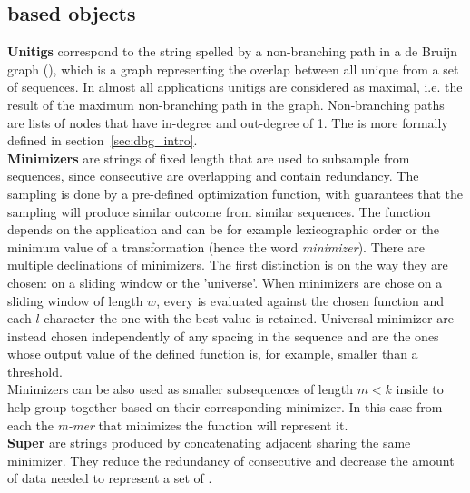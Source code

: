 \subsection{\kmer based objects}
\label{sec:kmerobjects}
\textbf{Unitigs} correspond to the string spelled by a non-branching path in a de Bruijn graph (\dbg), which is a graph representing the overlap between all unique \kmers from a set of sequences. In almost all applications unitigs are considered as maximal, i.e. the result of the maximum non-branching path in the graph. Non-branching paths are lists of nodes that have in-degree and out-degree of 1. The \dbg is more formally defined in section~\ref{sec:dbg_intro}.\\
\textbf{Minimizers} are strings of fixed length that are used to subsample \kmers from sequences, since consecutive \kmers are overlapping and contain redundancy. The sampling is done by a pre-defined optimization function, with guarantees that the sampling will produce similar outcome from similar sequences. The function depends on the application and can be for example lexicographic order or the minimum value of a transformation (hence the word \emph{minimizer}). There are multiple declinations of minimizers. The first distinction is on the way they are chosen: on a sliding window or the 'universe'. When minimizers are chose on a sliding window of length $w$, every \kmer is evaluated against the chosen function and each $l$ character the one with the best value is retained. Universal minimizer are instead chosen independently of any spacing in the sequence and are the ones whose output value of the defined function is, for example, smaller than a threshold. \\
Minimizers can be also used as smaller subsequences of length $m < k$ inside \kmers to help group together \kmers based on their corresponding minimizer. In this case from each \kmer the \emph{m-mer} that minimizes the function will represent it. \\
\textbf{Super\kmers} are strings produced by concatenating adjacent \kmers sharing the same minimizer. They reduce the redundancy of consecutive \kmers and decrease the amount of data needed to represent a set of \kmers. 
